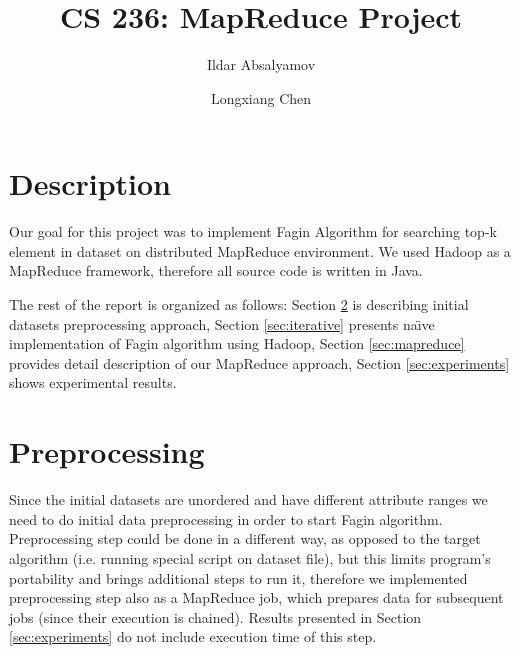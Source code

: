 \documentclass[a4paper]{article}
\title{CS 236: MapReduce Project}
\author{Ildar Absalyamov \and Longxiang Chen}
\begin{document}
\maketitle

\section{Description}

Our goal for this project was to implement Fagin Algorithm for searching top-k element in dataset on distributed MapReduce environment.
We used Hadoop as a MapReduce framework, therefore all source code is written in Java.

The rest of the report is organized as follows: Section \ref{sec:preprocess} is describing initial datasets preprocessing approach, Section \ref{sec:iterative} presents na\"{\i}ve implementation of Fagin algorithm using Hadoop, Section \ref{sec:mapreduce} provides detail description of our MapReduce approach, Section \ref{sec:experiments} shows experimental results.

\section{Preprocessing}
\label{sec:preprocess}

Since the initial datasets are unordered and have different attribute ranges we need to do initial data preprocessing in order to start Fagin algorithm.
Preprocessing step could be done in a different way, as opposed to the target algorithm (i.e. running special script on dataset file), but this limits program's portability and brings additional steps to run it, therefore we implemented preprocessing step also as a MapReduce job, which prepares data for subsequent jobs (since their execution is chained).
Results presented in Section \ref{sec:experiments} do not include execution time of this step.
\end{document}
